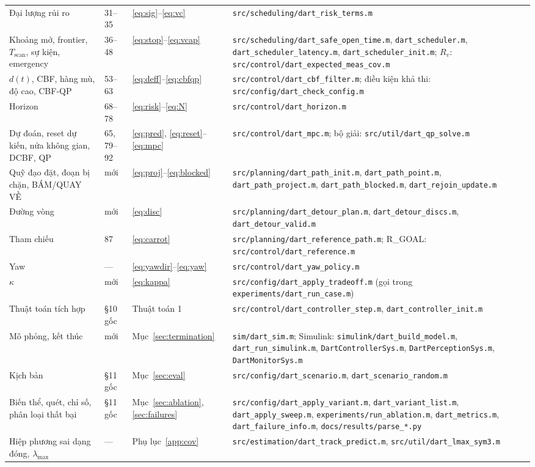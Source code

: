 \documentclass[11pt,a4paper]{article}
\numberwithin{equation}{section}
\newcommand{\code}[1]{\texttt{\small #1}}
\newcommand{\lmax}{\lambda_{\max}}
\theoremstyle{definition}
\theoremstyle{plain}
\theoremstyle{remark}
\begin{document}
{\begin{longtable}{@{}p{3.6cm}p{1.7cm}p{2.2cm}>{\raggedright\arraybackslash}p{7.5cm}@{}}
Đại lượng rủi ro & 31--35 & \eqref{eq:sig}--\eqref{eq:vc} & \code{src/scheduling/dart\_risk\_terms.m} \\
Khoảng mở, frontier, $T_{\text{scan}}$, sự kiện, emergency & 36--48 & \eqref{eq:stop}--\eqref{eq:vcap} & \code{src/scheduling/dart\_safe\_open\_time.m}, \code{dart\_scheduler.m}, \code{dart\_scheduler\_latency.m}, \code{dart\_scheduler\_init.m}; $R_v$: \code{src/control/dart\_expected\_meas\_cov.m} \\
$d(t)$, CBF, hàng mù, độ cao, CBF-QP & 53--63 & \eqref{eq:deff}--\eqref{eq:cbfqp} & \code{src/control/dart\_cbf\_filter.m}; điều kiện khả thi: \code{src/config/dart\_check\_config.m} \\
Horizon & 68--78 & \eqref{eq:risk}--\eqref{eq:N} & \code{src/control/dart\_horizon.m} \\
Dự đoán, reset dự kiến, nửa không gian, DCBF, QP & 65, 79--92 & \eqref{eq:pred}, \eqref{eq:reset}--\eqref{eq:mpc} & \code{src/control/dart\_mpc.m}; bộ giải: \code{src/util/dart\_qp\_solve.m} \\
Quỹ đạo đặt, đoạn bị chặn, BÁM/QUAY VỀ & mới & \eqref{eq:proj}--\eqref{eq:blocked} & \code{src/planning/dart\_path\_init.m}, \code{dart\_path\_point.m}, \code{dart\_path\_project.m}, \code{dart\_path\_blocked.m}, \code{dart\_rejoin\_update.m} \\
Đường vòng & mới & \eqref{eq:disc} & \code{src/planning/dart\_detour\_plan.m}, \code{dart\_detour\_discs.m}, \code{dart\_detour\_valid.m} \\
Tham chiếu & 87 & \eqref{eq:carrot} & \code{src/planning/dart\_reference\_path.m}; R\_GOAL: \code{src/control/dart\_reference.m} \\
Yaw & --- & \eqref{eq:yawdir}--\eqref{eq:yaw} & \code{src/control/dart\_yaw\_policy.m} \\
$\kappa$ & mới & \eqref{eq:kappa} & \code{src/config/dart\_apply\_tradeoff.m} (gọi trong \code{experiments/dart\_run\_case.m}) \\
Thuật toán tích hợp & \S10 gốc & Thuật toán 1 & \code{src/control/dart\_controller\_step.m}, \code{dart\_controller\_init.m} \\
Mô phỏng, kết thúc & mới & Mục~\ref{sec:termination} & \code{sim/dart\_sim.m}; Simulink: \code{simulink/dart\_build\_model.m}, \code{dart\_run\_simulink.m}, \code{DartControllerSys.m}, \code{DartPerceptionSys.m}, \code{DartMonitorSys.m} \\
Kịch bản & \S11 gốc & Mục~\ref{sec:eval} & \code{src/config/dart\_scenario.m}, \code{dart\_scenario\_random.m} \\
Biến thể, quét, chỉ số, phân loại thất bại & \S11 gốc & Mục~\ref{sec:ablation}, \ref{sec:failures} & \code{src/config/dart\_apply\_variant.m}, \code{dart\_variant\_list.m}, \code{dart\_apply\_sweep.m}, \code{experiments/run\_ablation.m}, \code{dart\_metrics.m}, \code{dart\_failure\_info.m}, \code{docs/results/parse\_*.py} \\
Hiệp phương sai dạng đóng, $\lmax$ & --- & Phụ lục~\ref{app:cov} & \code{src/estimation/dart\_track\_predict.m}, \code{src/util/dart\_lmax\_sym3.m} \\
\bottomrule
\end{longtable}
}
\end{document}

